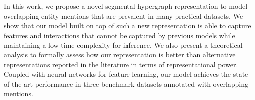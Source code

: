 In this work, we propose a novel segmental hypergraph representation to model overlapping entity mentions that are prevalent in many practical datasets. We show that our model built on top of such a new representation is able to capture features and interactions that cannot be captured by previous models while maintaining a low time complexity for inference. We also present a theoretical analysis to formally assess how our representation is better than alternative representations reported in the literature in terms of representational power. Coupled with neural networks for feature learning, our model achieves the state-of-the-art performance in three benchmark datasets annotated with overlapping mentions.
